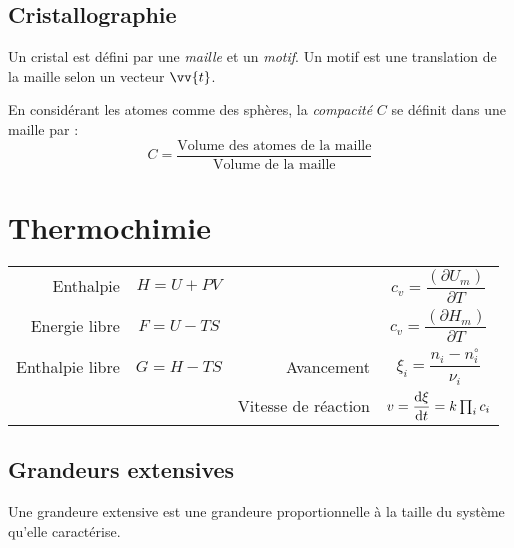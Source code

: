 \documentclass[11pt,a4paper,fleqn,pdftex]{report}
\begin{document}
\section{Cristallographie} %
\label{sec:cristallographie}
\begin{dfn}[Cristal]
   Un cristal est défini par une \emph{maille} et un \emph{motif}. Un motif est une translation de la maille selon un vecteur $\vv{t}$.
\end{dfn}
\begin{dfn}[Compacité]
   En considérant les atomes comme des sphères, la \emph{compacité} $C$ se définit dans une maille par :
   \begin{equation}
    C = \dfrac{\text{Volume des atomes de la maille}}{\text{Volume de la maille}}
   \end{equation}
\end{dfn}
\chapter{Thermochimie}
%
\begin{methode}
  \begin{tabular}{r c | r c}
    Enthalpie       & $H = U + PV$  
      & \parbox[c]{5cm}{}  & $c_v = \dfrac{\left( \partial U_m \right)}{\partial T}$ \\[10pt]
    Energie libre   & $F = U - TS$  
      & \parbox[c]{5cm}{} & $c_v = \dfrac{\left( \partial H_m \right)}{\partial T}$\\[10pt]
    Enthalpie libre & $G = H - TS$  & Avancement  & $\xi_i = \dfrac{n_i - n_i^\circ}{\nu_i}$ \\[10pt]
    & & Vitesse de réaction & $v = \dfrac{\mathrm{d} \xi}{\mathrm{d} t} = k\prod_i c_i$
  \end{tabular}
\end{methode}
\section{Grandeurs extensives}
\begin{dfn}
  Une grandeure extensive est une grandeure proportionnelle à la taille du système qu'elle caractérise.
\end{dfn}
\end{document}
